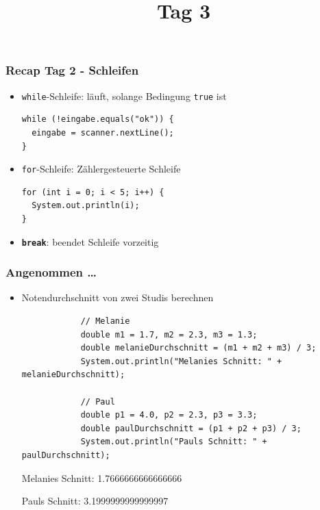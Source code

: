 \documentclass{../../presentation}
\title{\vkTitle\ Tag 3}
\author{\vkAuthors}
\institute{\vkInstitute}
\date{\vkDateDayThree}
\begin{document}
\begin{frame}
	\titlepage
\end{frame}

\begin{frame}[fragile]
	\frametitle{Recap Tag 2 - Schleifen}

	\begin{itemize}
		\item\pause \texttt{while}-Schleife: läuft, solange Bedingung \texttt{true} ist
		      \begin{verbatim}
while (!eingabe.equals("ok")) {
  eingabe = scanner.nextLine();
}
          \end{verbatim}
		\item\pause \texttt{for}-Schleife: Zählergesteuerte Schleife
		      \begin{verbatim}
for (int i = 0; i < 5; i++) {
  System.out.println(i);
}
          \end{verbatim}
		\item\pause \textbf{\texttt{break}}: beendet Schleife vorzeitig

	\end{itemize}
\end{frame}

\begin{frame}[fragile]
	\frametitle{Angenommen \dots}
	\begin{itemize}
		\item\pause Notendurchschnitt von zwei Studis berechnen
		      \begin{verbatim}
            // Melanie
            double m1 = 1.7, m2 = 2.3, m3 = 1.3;
            double melanieDurchschnitt = (m1 + m2 + m3) / 3;
            System.out.println("Melanies Schnitt: " + melanieDurchschnitt);

            // Paul
            double p1 = 4.0, p2 = 2.3, p3 = 3.3;
            double paulDurchschnitt = (p1 + p2 + p3) / 3;
            System.out.println("Pauls Schnitt: " + paulDurchschnitt);
        \end{verbatim}
		      \begin{ausgabe}
			      Melanies Schnitt: 1.7666666666666666

			      Pauls Schnitt: 3.1999999999999997
		      \end{ausgabe}
	\end{itemize}
\end{frame}
\end{document}
